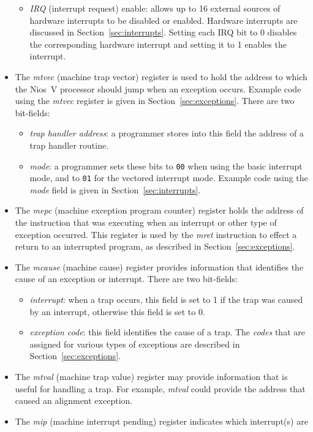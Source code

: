 \documentclass[11pt, twoside, pdftex]{article}
\begin{document}
\begin{itemize}
\begin{itemize}
\item {\it IRQ} (interrupt request) enable: allows up to 16 external sources of hardware
interrupts to be disabled or enabled. Hardware interrupts are discussed in 
Section~\ref{sec:interrupts}. Setting each IRQ bit to 0 disables the corresponding
hardware interrupt and setting it to 1 enables the interrupt.
\end{itemize}
\item The {\it mtvec} (machine trap vector) register is used to hold the address to which
the Nios~V processor should jump when an exception occurs. Example code using the
{\it mtvec} register is given in Section~\ref{sec:exceptions}.  There are two bit-fields:
\begin{itemize}
\item {\it trap handler address}: a programmer stores into this field the address of a trap
handler routine.
\item {\it mode}: a programmer sets these bits to \texttt{00} when using the basic interrupt
mode, and to \texttt{01} for the vectored interrupt mode. Example code using the
{\it mode} field is given in Section~\ref{sec:interrupts}.
\end{itemize}
\item The {\it mepc} (machine exception program counter) register holds the address of
the instruction that was executing when an interrupt or other type of exception occurred.
This register is used by the {\it mret} instruction to effect a return to an interrupted
program, as described in Section~\ref{sec:exceptions}.
\item The {\it mcause} (machine cause) register provides information that identifies the
cause of an exception or interrupt. There are two bit-fields:
\begin{itemize}
\item {\it interrupt}: when a trap occurs, this field is set to 1 if the trap was caused
by an interrupt, otherwise this field is set to 0.
\item {\it exception code}: this field identifies the cause of a trap. The {\it codes} that are
assigned for various types of exceptions are described in Section~\ref{sec:exceptions}.
\end{itemize}
\item The {\it mtval} (machine trap value) register may provide information that is useful 
for handling a trap. For example, {\it mtval} could provide the address that caused an 
alignment exception.
\item The {\it mip} (machine interrupt pending) register indicates which interrupt(s) are 

\end{itemize}
\end{document}
